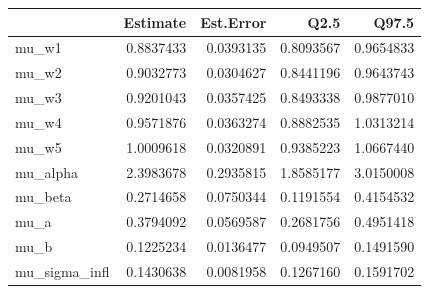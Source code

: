 
\begin{tabular}{lrrrr}
\toprule
  & Estimate & Est.Error & Q2.5 & Q97.5\\
\midrule
mu\_w1 & 0.8837433 & 0.0393135 & 0.8093567 & 0.9654833\\
mu\_w2 & 0.9032773 & 0.0304627 & 0.8441196 & 0.9643743\\
mu\_w3 & 0.9201043 & 0.0357425 & 0.8493338 & 0.9877010\\
mu\_w4 & 0.9571876 & 0.0363274 & 0.8882535 & 1.0313214\\
mu\_w5 & 1.0009618 & 0.0320891 & 0.9385223 & 1.0667440\\
\addlinespace
mu\_alpha & 2.3983678 & 0.2935815 & 1.8585177 & 3.0150008\\
mu\_beta & 0.2714658 & 0.0750344 & 0.1191554 & 0.4154532\\
mu\_a & 0.3794092 & 0.0569587 & 0.2681756 & 0.4951418\\
mu\_b & 0.1225234 & 0.0136477 & 0.0949507 & 0.1491590\\
mu\_sigma\_infl & 0.1430638 & 0.0081958 & 0.1267160 & 0.1591702\\
\bottomrule
\end{tabular}
